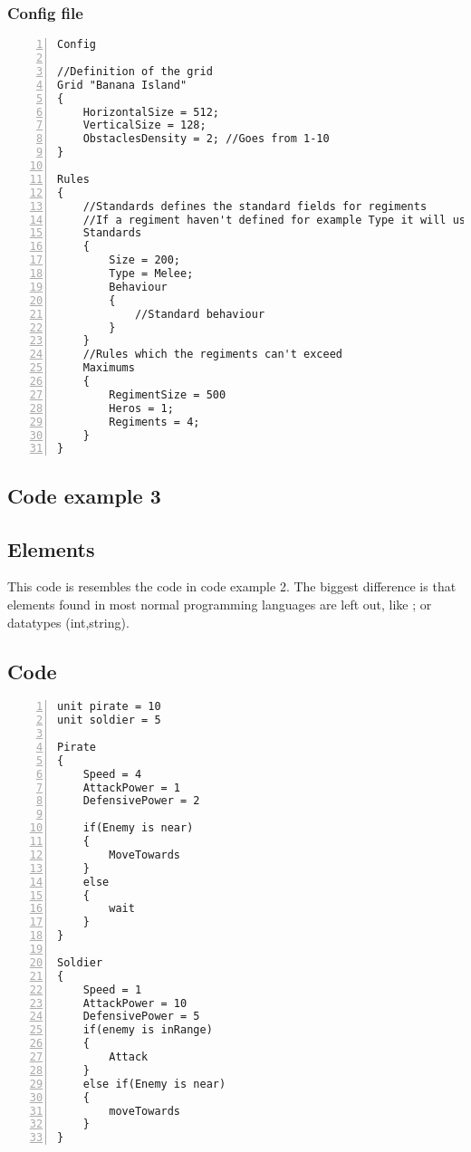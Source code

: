 				\subsubsection{Config file}
					\begin{lstlisting}[basicstyle=\small\sffamily,
					keywords={break,case,const,continue,default,else,enum,
					for,if,return,switch,while,do,long,void,int,float,double,
					char,struct,typedef,include,size\_t},
					keywordstyle={\color{blue}},
					comment={[l]{//}}, morecomment={[s]{/*}{*/}}, commentstyle=\itshape,
					columns={[l]flexible}, numbers=left, numberstyle=\tiny,
					frameround=fftt, frame=shadowbox, captionpos=b,
					caption={Config file of the code example 3},
					label=LST:code32]
Config

//Definition of the grid
Grid "Banana Island"
{
	HorizontalSize = 512;
	VerticalSize = 128;
	ObstaclesDensity = 2; //Goes from 1-10
}

Rules
{
	//Standards defines the standard fields for regiments
	//If a regiment haven't defined for example Type it will use the Type in Standards
	Standards
	{
		Size = 200;
		Type = Melee;
		Behaviour
		{
			//Standard behaviour
		}
	}
	//Rules which the regiments can't exceed
	Maximums
	{
		RegimentSize = 500
		Heros = 1;
		Regiments = 4;
	}
}
					\end{lstlisting}				
	\subsection{Code example 3}
			\subsection{Elements}
				This code is resembles the code in code example 2. The biggest difference is that
				elements found in most normal programming languages are left out, like ; or datatypes
				(int,string).
			\subsection{Code}
				\begin{lstlisting}[basicstyle=\small\sffamily,
				keywords={break,case,const,continue,default,else,enum,
				for,if,return,switch,while,do,long,void,int,float,double,
				char,struct,typedef,include,size\_t},
				keywordstyle={\color{blue}},
				comment={[l]{//}}, morecomment={[s]{/*}{*/}}, commentstyle=\itshape,
				columns={[l]flexible}, numbers=left, numberstyle=\tiny,
				frameround=fftt, frame=shadowbox, captionpos=b,
				caption={Code example 3},
				label=LST:code3]
unit pirate = 10
unit soldier = 5

Pirate
{
	Speed = 4
	AttackPower = 1
	DefensivePower = 2
	
	if(Enemy is near)
	{
		MoveTowards
	}
	else
	{
		wait
	}
}

Soldier
{
	Speed = 1
	AttackPower = 10
	DefensivePower = 5
	if(enemy is inRange)
	{
		Attack
	}
	else if(Enemy is near)
	{
		moveTowards		
	}
}
				\end{lstlisting}				
